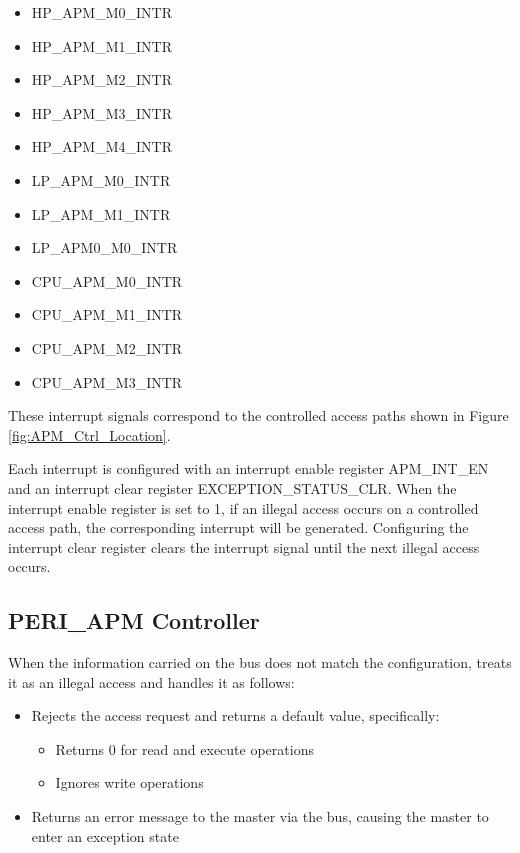 \documentclass[main\_\_EN.tex]{subfiles}
\begin{document}
\begin{itemize}
    \item HP\_APM\_M0\_INTR
    \item HP\_APM\_M1\_INTR
    \item HP\_APM\_M2\_INTR
    \item HP\_APM\_M3\_INTR
    \item HP\_APM\_M4\_INTR
    \item LP\_APM\_M0\_INTR
    \item LP\_APM\_M1\_INTR
    \item LP\_APM0\_M0\_INTR
    \item CPU\_APM\_M0\_INTR
    \item CPU\_APM\_M1\_INTR
    \item CPU\_APM\_M2\_INTR
    \item CPU\_APM\_M3\_INTR
\end{itemize}

These interrupt signals correspond to the controlled access paths shown in Figure \ref{fig:APM_Ctrl_Location}.

Each interrupt is configured with an interrupt enable register APM\_INT\_EN and an interrupt clear register EXCEPTION\_STATUS\_CLR. When the interrupt enable register is set to 1, if an illegal access occurs on a controlled access path, the corresponding interrupt will be generated. Configuring the interrupt clear register clears the interrupt signal until the next illegal access occurs.

\subsection{PERI\_APM Controller}

When the information carried on the bus does not match the configuration, \chipname{} treats it as an illegal access and handles it as follows:

\begin{itemize}
    \item Rejects the access request and returns a default value, specifically:
    \begin{itemize}
        \item Returns 0 for read and execute operations
        \item Ignores write operations
    \end{itemize}
    \item Returns an error message to the master via the bus, causing the master to enter an exception state
\end{itemize}
\end{document}
